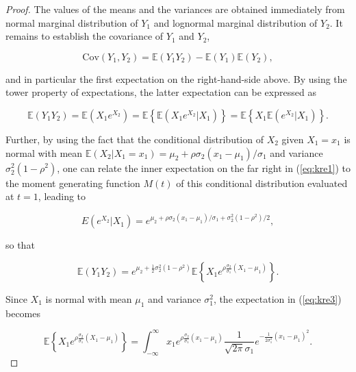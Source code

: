 \documentclass[
]{jss}
\begin{document}
\begin{proof}
The values of the means and the variances are obtained immediately from normal marginal distribution of $Y_1$ and lognormal marginal distribution of $Y_2$. It remains to establish the covariance of $Y_1$ and $Y_2$, 

\begin{equation}
\label{eq:covy1y2}
\mbox{Cov}(Y_1, Y_2) = \mathbb E(Y_1 Y_2) - \mathbb E(Y_1)\mathbb E(Y_2), 
\end{equation}

and in particular the first expectation on the right-hand-side above. By using the tower property of expectations, the latter expectation can be expressed as 

\begin{equation}
\label{eq:kre1}
\mathbb E(Y_1 Y_2)  =  \mathbb E\left(X_1 e^{X_2}\right)  =  \mathbb E \left\{ \mathbb E \left(X_1 e^{X_2} | X_1 \right) \right\} = \mathbb E \left\{ X_1 \mathbb E \left(e^{X_2} | X_1 \right) \right\}.
\end{equation}

Further, by using the fact that the conditional distribution of $X_2$ given $X_1=x_1$ is normal with mean $\mathbb E(X_2|X_1=x_1) = \mu_2+\rho\sigma_2(x_1-\mu_1)/\sigma_1$ and variance $\sigma_2^2(1-\rho^2)$, one can relate the inner expectation on the far right in (\ref{eq:kre1}) to the moment generating function $M(t)$ of this conditional distribution evaluated at $t=1$, leading to 

\begin{equation}
\label{eq:kre2}
E \left(e^{X_2} | X_1 \right) = e^{ \mu_2+\rho\sigma_2(x_1-\mu_1)/\sigma_1 + \sigma_2^2(1-\rho^2)/2},
\end{equation}

so that 

\begin{equation}
\label{eq:kre3}
\mathbb E(Y_1 Y_2)  =  e^{ \mu_2+ \frac{1}{2} \sigma_2^2(1-\rho^2)} \mathbb E \left\{ X_1 e^{ \rho\frac{\sigma_2}{\sigma_1} (X_1-\mu_1)} \right\}.
\end{equation}

Since $X_1$ is normal with mean $\mu_1$ and variance $\sigma_1^2$, the expectation in (\ref{eq:kre3}) becomes 

\begin{equation}
\label{eq:kre4}
\mathbb E \left\{ X_1 e^{ \rho\frac{\sigma_2}{\sigma_1} (X_1-\mu_1)} \right\} = \int_{-\infty}^\infty x_1 e^{ \rho\frac{\sigma_2}{\sigma_1} (x_1-\mu_1)} \frac{1}{\sqrt{2\pi}\sigma_1} e^{-\frac{1}{2\sigma_1^2}(x_1-\mu_1)^2}.
\end{equation}


\end{proof}
\end{document}
